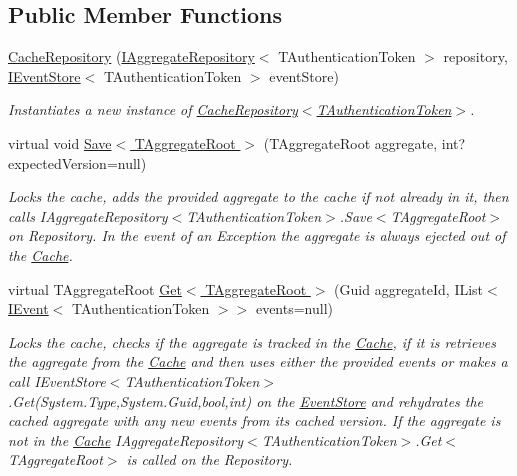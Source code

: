 \subsection*{Public Member Functions}
\begin{DoxyCompactItemize}
\item 
\hyperlink{classCqrs_1_1Cache_1_1CacheRepository_a6c567e999a85f5803a920ce4912833a9_a6c567e999a85f5803a920ce4912833a9}{Cache\+Repository} (\hyperlink{interfaceCqrs_1_1Domain_1_1IAggregateRepository}{I\+Aggregate\+Repository}$<$ T\+Authentication\+Token $>$ repository, \hyperlink{interfaceCqrs_1_1Events_1_1IEventStore}{I\+Event\+Store}$<$ T\+Authentication\+Token $>$ event\+Store)
\begin{DoxyCompactList}\small\item\em Instantiates a new instance of \hyperlink{classCqrs_1_1Cache_1_1CacheRepository_a6c567e999a85f5803a920ce4912833a9_a6c567e999a85f5803a920ce4912833a9}{Cache\+Repository$<$\+T\+Authentication\+Token$>$}. \end{DoxyCompactList}\item 
virtual void \hyperlink{classCqrs_1_1Cache_1_1CacheRepository_a69df7ee1dc2e4cd38431ab987655eab3_a69df7ee1dc2e4cd38431ab987655eab3}{Save$<$ T\+Aggregate\+Root $>$} (T\+Aggregate\+Root aggregate, int? expected\+Version=null)
\begin{DoxyCompactList}\small\item\em Locks the cache, adds the provided {\itshape aggregate}  to the cache if not already in it, then calls I\+Aggregate\+Repository$<$\+T\+Authentication\+Token$>$.\+Save$<$\+T\+Aggregate\+Root$>$ on Repository. In the event of an Exception the {\itshape aggregate}  is always ejected out of the \hyperlink{namespaceCqrs_1_1Cache}{Cache}. \end{DoxyCompactList}\item 
virtual T\+Aggregate\+Root \hyperlink{classCqrs_1_1Cache_1_1CacheRepository_a037acba636aedf23ff376ac0b749ec0c_a037acba636aedf23ff376ac0b749ec0c}{Get$<$ T\+Aggregate\+Root $>$} (Guid aggregate\+Id, I\+List$<$ \hyperlink{interfaceCqrs_1_1Events_1_1IEvent}{I\+Event}$<$ T\+Authentication\+Token $>$$>$ events=null)
\begin{DoxyCompactList}\small\item\em Locks the cache, checks if the aggregate is tracked in the \hyperlink{namespaceCqrs_1_1Cache}{Cache}, if it is retrieves the aggregate from the \hyperlink{namespaceCqrs_1_1Cache}{Cache} and then uses either the provided {\itshape events}  or makes a call I\+Event\+Store$<$\+T\+Authentication\+Token$>$.\+Get(\+System.\+Type,\+System.\+Guid,bool,int) on the \hyperlink{namespaceCqrs_1_1EventStore}{Event\+Store} and rehydrates the cached aggregate with any new events from it\textquotesingle{}s cached version. If the aggregate is not in the \hyperlink{namespaceCqrs_1_1Cache}{Cache} I\+Aggregate\+Repository$<$\+T\+Authentication\+Token$>$.\+Get$<$\+T\+Aggregate\+Root$>$ is called on the Repository. \end{DoxyCompactList}\end{DoxyCompactItemize}


